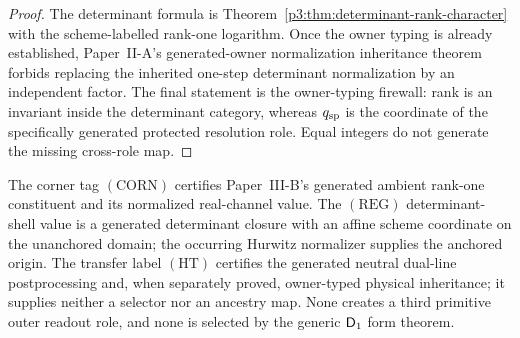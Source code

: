\documentclass[12pt,a4paper]{article}
\begin{document}
\begin{proof}
The determinant formula is Theorem~\ref{p3:thm:determinant-rank-character}
with the scheme-labelled rank-one logarithm.  Once the owner typing is already
established, Paper~II-A's generated-owner normalization inheritance theorem
forbids replacing the inherited one-step determinant normalization by an
independent factor.  The final statement is the owner-typing firewall: rank is
an invariant inside the determinant category, whereas \(q_{\rm sp}\) is the
coordinate of the specifically generated protected resolution role.  Equal
integers do not generate the missing cross-role map.
\end{proof}

\begin{remark}
The corner tag \((\mathrm{CORN})\) certifies Paper~III-B's generated ambient
rank-one constituent and its normalized real-channel value.  The \((\mathrm{REG})\) determinant-shell value is a generated determinant closure with an affine scheme coordinate on the unanchored domain; the occurring Hurwitz normalizer supplies the anchored origin.  The transfer label \((\mathrm{HT})\) certifies
the generated neutral dual-line postprocessing and, when separately proved,
owner-typed physical inheritance; it supplies neither a selector nor an
ancestry map.  None creates a third primitive outer
readout role, and none is selected by the generic \(\mathsf{D}_1\) form theorem.
\end{remark}
\end{document}
